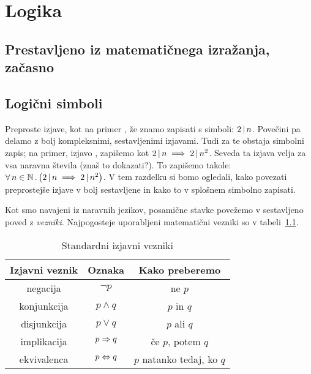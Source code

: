 \chapter{Logika}\label{poglavje:logika}

\section{Prestavljeno iz matematičnega izražanja, začasno}
\label{sec:prest-iz-matm}


\section{Logični simboli}\label{razdelek:logicni-simboli}

Preproste izjave, kot na primer , že znamo zapisati s simboli: $2 \,|\, n$. Povečini pa delamo z bolj kompleksnimi, sestavljenimi izjavami. Tudi za te obstaja simbolni zapis; na primer, izjavo , zapišemo kot $2 \,|\, n \implies 2 \,|\, n^2$. Seveda ta izjava velja za vsa naravna števila (znaš to dokazati?). To zapišemo takole: $\all{n}[\NN]{2 \divides n \implies 2 \divides n^2}$. V tem razdelku si bomo ogledali, kako povezati preprostejše izjave v bolj sestavljene in kako to v splošnem simbolno zapisati.

Kot smo navajeni iz naravnih jezikov, posamične stavke povežemo v sestavljeno poved z \emph{vezniki}. Najpogosteje uporabljeni matematični vezniki so v tabeli~\ref{tabela:standardni-izjavni-vezniki}.

\begin{table}[!ht]
\centering
\begin{tabular}{|ccc|}
\hline
\textbf{Izjavni veznik} & \textbf{Oznaka} & \textbf{Kako preberemo} \\
\hline
negacija & $\lnot{p}$ & ne $p$ \\
konjunkcija & $p \land q$ & $p$ in $q$ \\
disjunkcija & $p \lor q$ & $p$ ali $q$ \\
implikacija & $p \Rightarrow q$ & če $p$, potem $q$ \\
ekvivalenca & $p \Leftrightarrow q$ & $p$ natanko tedaj, ko $q$ \\
\hline
\end{tabular}
\caption{Standardni izjavni vezniki}\label{tabela:standardni-izjavni-vezniki}
\end{table}

